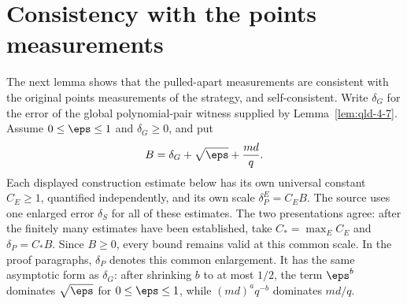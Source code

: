 \section{Consistency with the points measurements}

The next lemma shows that the pulled-apart measurements are consistent with the original points measurements of the strategy, and self-consistent. Write $\delta_G$ for the error of the global polynomial-pair witness supplied by Lemma~\ref{lem:qld-4-7}. Assume $0\leq\eps\leq1$ and $\delta_G\geq0$, and put
\[
	B = \delta_G + \sqrt{\eps} + \frac{md}{q}.
\]
Each displayed construction estimate below has its own universal constant $C_E \geq 1$, quantified independently, and its own scale $\delta_P^E=C_EB$. The source uses one enlarged error $\delta_S$ for all of these estimates. The two presentations agree: after the finitely many estimates have been established, take $C_* = \max_E C_E$ and $\delta_P=C_*B$. Since $B\geq0$, every bound remains valid at this common scale. In the proof paragraphs, $\delta_P$ denotes this common enlargement. It has the same asymptotic form as $\delta_G$: after shrinking $b$ to at most $1/2$, the term $\eps^b$ dominates $\sqrt{\eps}$ for $0 \leq \eps \leq 1$, while $(md)^a q^{-b}$ dominates $md/q$.

